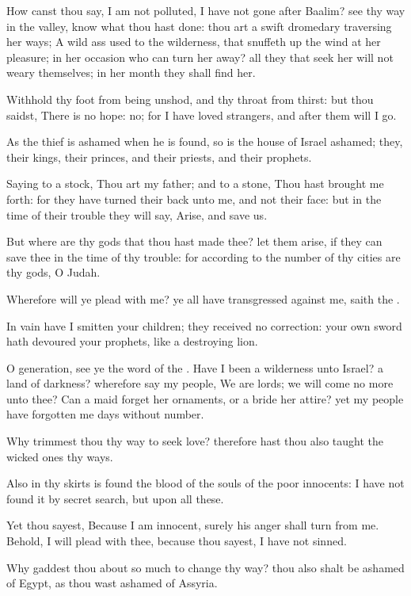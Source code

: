 \verse How canst thou say, I am not polluted, I have not gone after Baalim?  see thy way in the valley, know what thou hast done: thou art a swift dromedary traversing her ways; \verse A wild ass used to the wilderness, that snuffeth up the wind at her pleasure; in her occasion who can turn her away? all they that seek her will not weary themselves; in her month they shall find her.

\verse Withhold thy foot from being unshod, and thy throat from thirst: but thou saidst, There is no hope: no; for I have loved strangers, and after them will I go.

\verse As the thief is ashamed when he is found, so is the house of Israel ashamed; they, their kings, their princes, and their priests, and their prophets.

\verse Saying to a stock, Thou art my father; and to a stone, Thou hast brought me forth: for they have turned their back unto me, and not their face: but in the time of their trouble they will say, Arise, and save us.

\verse But where are thy gods that thou hast made thee? let them arise, if they can save thee in the time of thy trouble: for according to the number of thy cities are thy gods, O Judah.

\verse Wherefore will ye plead with me? ye all have transgressed against me, saith the \LORD.

\verse In vain have I smitten your children; they received no correction: your own sword hath devoured your prophets, like a destroying lion.

\verse O generation, see ye the word of the \LORD. Have I been a wilderness unto Israel? a land of darkness? wherefore say my people, We are lords; we will come no more unto thee?  \verse Can a maid forget her ornaments, or a bride her attire? yet my people have forgotten me days without number.

\verse Why trimmest thou thy way to seek love? therefore hast thou also taught the wicked ones thy ways.

\verse Also in thy skirts is found the blood of the souls of the poor innocents: I have not found it by secret search, but upon all these.

\verse Yet thou sayest, Because I am innocent, surely his anger shall turn from me. Behold, I will plead with thee, because thou sayest, I have not sinned.

\verse Why gaddest thou about so much to change thy way? thou also shalt be ashamed of Egypt, as thou wast ashamed of Assyria.

